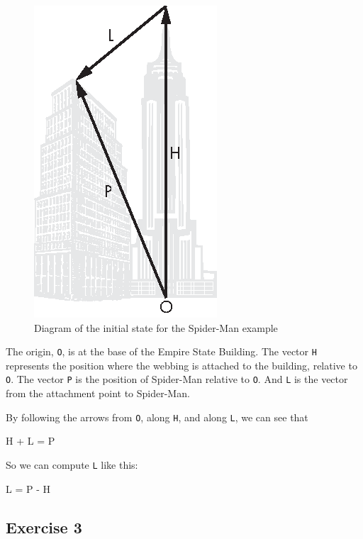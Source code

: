
\begin{figure}[h]
\includegraphics{images/figure14_01_new.eps}
\caption{Diagram of the initial state for the Spider-Man example}
\label{spiderman}
\end{figure}

The origin, \lstinline{O}, is at the base of the Empire State Building. The
vector \lstinline{H} represents the position where the webbing is attached
to the building, relative to \lstinline{O}. The vector \lstinline{P} is the
position of Spider-Man relative to \lstinline{O}. And \lstinline{L} is the
vector from the attachment point to Spider-Man.


By following the arrows from \lstinline{O}, along \lstinline{H}, and along
\lstinline{L}, we can see that

\begin{code}
H + L = P
\end{code}

So we can compute \lstinline{L} like this:

\begin{code}
L = P - H
\end{code}

\subsection{Exercise 3}

